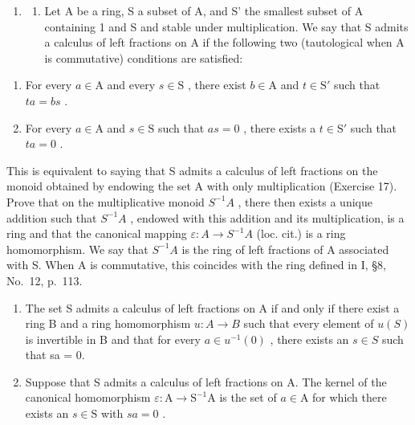 \begin{enumerate}
\def\labelenumi{\arabic{enumi})}
\setcounter{enumi}{17}
\tightlist
\item
  \begin{enumerate}
  \def\labelenumii{\alph{enumii})}
  \tightlist
  \item
    Let A be a ring, S a subset of A, and S' the smallest subset of A containing 1 and S and stable under multiplication. We say that S admits a calculus of left fractions on A if the following two (tautological when A is commutative) conditions are satisfied:
  \end{enumerate}
\end{enumerate}

\begin{enumerate}
\def\labelenumi{(\roman{enumi})}
\item
  For every \(a \in \mathrm{A}\) and every \(s \in \mathrm{S}\) , there exist \(b \in \mathrm{A}\) and \(t \in \mathrm{S}'\) such that \(ta = bs\) .
\item
  For every \(a \in \mathrm{A}\) and \(s \in \mathrm{S}\) such that \(as = 0\) , there exists a \(t \in \mathrm{S}'\) such that \(ta = 0\) .
\end{enumerate}

This is equivalent to saying that S admits a calculus of left fractions on the monoid obtained by endowing the set A with only multiplication (Exercise 17). Prove that on the multiplicative monoid \(S^{-1}A\) , there then exists a unique addition such that \(S^{-1}A\) , endowed with this addition and its multiplication, is a ring and that the canonical mapping \(\varepsilon: A \to S^{-1}A\) (loc. cit.) is a ring homomorphism. We say that \(S^{-1}A\) is the ring of left fractions of A associated with S. When A is commutative, this coincides with the ring defined in I, §8, No.~12, p.~113.

\begin{enumerate}
\def\labelenumi{\alph{enumi})}
\setcounter{enumi}{1}
\item
  The set S admits a calculus of left fractions on A if and only if there exist a ring B and a ring homomorphism \(u: A \to B\) such that every element of \(u(S)\) is invertible in B and that for every \(a \in u^{-1}(0)\) , there exists an \(s \in S\) such that sa = 0.
\item
  Suppose that S admits a calculus of left fractions on A. The kernel of the canonical homomorphism \(\varepsilon : \mathrm{A} \to \mathrm{S}^{-1}\mathrm{A}\) is the set of \(a \in \mathrm{A}\) for which there exists an \(s \in \mathrm{S}\) with \(sa = 0\) .
\end{enumerate}

